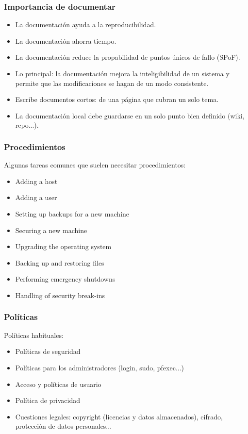 \documentclass{beamer}
\begin{document}
\begin{frame}
\frametitle{Importancia de documentar}

\begin{itemize}
\item La documentación ayuda a la reproducibilidad. 
\item La documentación ahorra tiempo. 
\item La documentación reduce la propabilidad de puntos únicos de fallo (SPoF).
\item Lo principal: la documentación mejora la inteligibilidad de un sistema y permite que
	las modificaciones se hagan de un modo consistente.
\item Escribe documentos cortos: de una página que cubran un solo tema.
\item La documentación local debe guardarse en un solo punto bien definido (wiki, repo...).
\end{itemize}

\end{frame}





\begin{frame}
\frametitle{Procedimientos}

Algunas tareas comunes que suelen necesitar procedimientos:

\begin{itemize}
\item Adding a host
\item Adding a user
\item Setting up backups for a new machine
\item Securing a new machine
\item Upgrading the operating system
\item Backing up and restoring files
\item Performing emergency shutdowns
\item Handling of security break-ins
\end{itemize}
\end{frame}


\begin{frame}
\frametitle{Políticas}

Políticas habituales:

\begin{itemize}
\item Políticas de seguridad
\item Políticas para los administradores (login, sudo, pfexec...)
\item Acceso y políticas de usuario
\item Política de privacidad
\item Cuestiones legales: copyright (licencias y datos almacenados), cifrado, protección de datos personales...
\end{itemize}
\end{frame}
\end{document}
